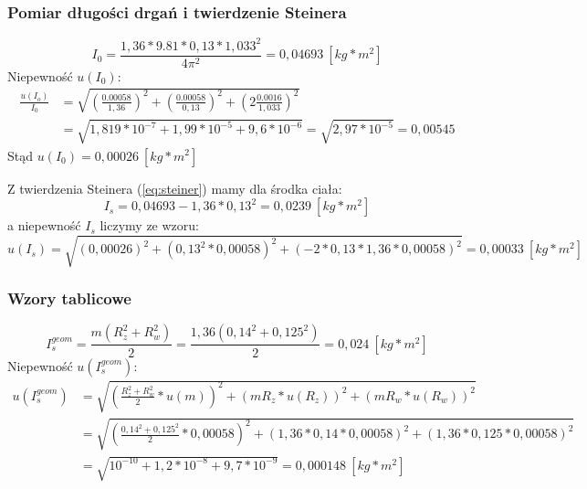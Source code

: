 \subsubsection{Pomiar długości drgań i twierdzenie Steinera}
$$I_0=\frac{1,36*9.81*0,13*1,033^2}{4\pi ^2}=0,04693~[kg*m^2]$$
Niepewność $u(I_0)$:
\begin{equation*}
\begin{split}
\frac{u(I_o)}{I_0}&=\sqrt{\left(\frac{0.00058}{1,36}\right) ^2+\left( \frac{0.00058}{0,13}\right)^2+\left(2 \frac{0.0016}{1,033}\right)^2}\\
&= \sqrt{1,819*10^{-7}+1,99*10^{-5}+9,6*10^{-6}} = \sqrt{2,97*10^{-5}} = 0,00545
\end{split}
\end{equation*}
Stąd $u(I_0)=0,00026~[kg*m^2]$
\newline

\noindent
Z twierdzenia Steinera (\ref{eq:steiner}) mamy dla środka ciała:
$$I_s=0,04693-1,36*0,13^2=0,0239~[kg*m^2]$$
a niepewność $I_s$ liczymy ze wzoru:
$$u(I_s)=\sqrt{\left( 0,00026\right)^2+\left(0,13^2*0,00058 \right)^2+\left( -2*0,13*1,36*0,00058\right)^2}=0,00033~[kg*m^2]$$
\subsubsection{Wzory tablicowe}
$$I_{s}^{geom}=\frac{m(R_z^2+R_w^2)}{2}=\frac{1,36(0,14^2+0,125^2)}{2}=0,024~[kg*m^2]$$
Niepewność $u(I_{s}^{geom})$:
\begin{equation*}
\begin{split}
u(I_{s}^{geom})&=\sqrt{\left (\frac{R_z^2+R_w^2}{2}*u(m) \right )^2+\left (mR_z*u(R_z) \right )^2+\left (mR_w*u(R_w) \right )^2}\\
&=\sqrt{\left (\frac{0,14^2+0,125^2}{2}*0,00058 \right )^2+\left (1,36*0,14*0,00058 \right )^2+\left (1,36*0,125*0,00058 \right )^2}\\
&=\sqrt{10^{-10}+1,2*10^{-8}+9,7*10^{-9}}=0,000148~[kg*m^2]
\end{split}
\end{equation*}
